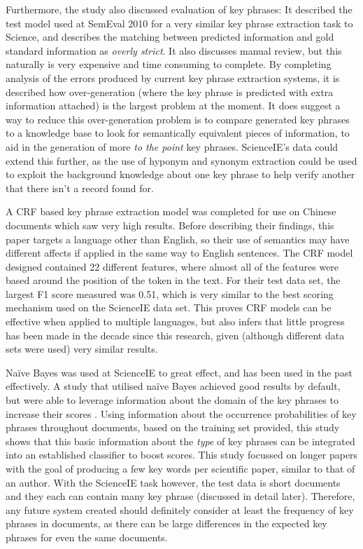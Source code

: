 Furthermore, the study also discussed evaluation of key phrases: It described the test model used at SemEval 2010 for a very similar key phrase extraction task to Science, and describes the matching between predicted information and gold standard information as \textit{overly strict}. It also discusses manual review, but this naturally is very expensive and time consuming to complete. By completing analysis of the errors produced by current key phrase extraction systems, it is described how over-generation (where the key phrase is predicted with extra information attached) is the largest problem at the moment. It does suggest a way to reduce this over-generation problem is to compare generated key phrases to a knowledge base to look for semantically equivalent pieces of information, to aid in the generation of more \textit{to the point} key phrases. ScienceIE's data could extend this further, as the use of hyponym and synonym extraction could be used to exploit the background knowledge about one key phrase to help verify another that there isn't a record found for.

A CRF based key phrase extraction model was completed for use on Chinese documents which saw very high results. Before describing their findings, this paper targets a language other than English, so their use of semantics may have different affects if applied in the same way to English sentences. The CRF model designed contained 22 different features, where almost all of the features were based around the position of the token in the text. For their test data set, the largest F1 score measured was 0.51, which is very similar to the best scoring mechanism used on the ScienceIE data set. This proves CRF models can be effective when applied to multiple languages, but also infers that little progress has been made in the decade since this research, given (although different data sets were used) very similar results. 

Naïve Bayes was used at ScienceIE to great effect, and has been used in the past effectively. A study that utilised naïve Bayes achieved good results by default, but were able to leverage information about the domain of the key phrases to increase their scores \cite{Wu2005}. Using information about the occurrence probabilities of key phrases throughout documents, based on the training set provided, this study shows that this basic information about the \textit{type} of key phrases can be integrated into an established classifier to boost scores. This study focussed on longer papers with the goal of producing a few key words per scientific paper, similar to that of an author. With the ScienceIE task however, the test data is short documents and they each can contain many key phrase (discussed in detail later). Therefore, any future system created should definitely consider at least the frequency of key phrases in documents, as there can be large differences in the expected key phrases for even the same documents.

